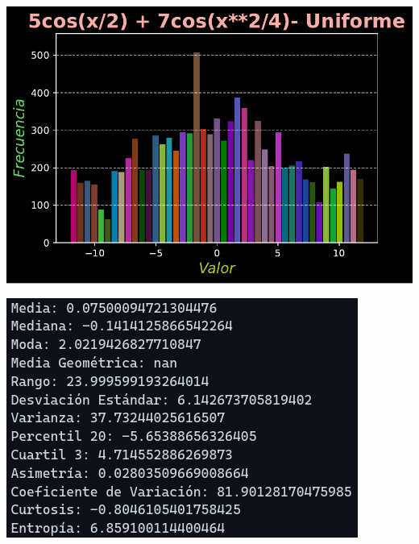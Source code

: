 \documentclass[11pt]{article} %
\begin{document}
	\begin{multicols}{2}
		\begin{minipage}{\linewidth}
			\centering
			\includegraphics[width=1\linewidth]{../transformaciones/per_uniforme2.pdf}
			\label{fig:perUnifHist}
		\end{minipage}
		\vfill\columnbreak
		\begin{minipage}{\linewidth}
			\centering
			\includegraphics[width=1\linewidth]{../transformaciones/per_uniforme3.png}
			\label{perUnifMet}
		\end{minipage}
	\end{multicols}
	
\end{document}
